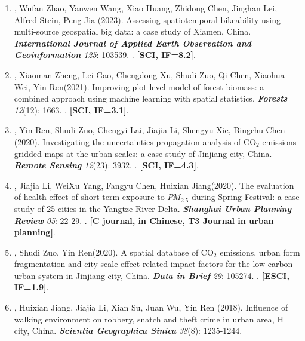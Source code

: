 \begin{enumerate}
    \Shaoqing, Ge Qiu, Yuchen Li, Shuhan Yang, Shujuan Yang, Peng Jia\CS (2024).
    State of the art of lifecourse cohort establishment. 
    \textbf{\textit{China CDC Weekly}} \textit{6}(14): 300–304 
    . \textbf{[SCI/SSCI, IF=3.5]}.
\item
    \Shaoqing, Wufan Zhao\CS, Yanwen Wang, Xiao Huang, Zhidong Chen, Jinghan Lei, Alfred Stein, Peng Jia (2023).
    Assessing spatiotemporal bikeability using multi-source geospatial big data: a case study of Xiamen, China. 
    \textbf{\textit{International Journal of Applied Earth Observation and Geoinformation}} \textit{125}: 103539.
    . \textbf{[SCI, IF=8.2]}.
\item
    \Shaoqing\CF, Xiaoman Zheng\CF, Lei Gao, Chengdong Xu, Shudi Zuo, Qi Chen, Xiaohua Wei, Yin Ren\CS (2021).
    Improving plot-level model of forest biomass: a combined approach using machine learning with spatial statistics.
    \textbf{\textit{Forests}} \textit{12}(12): 1663.
    . \textbf{[SCI, IF=3.1]}.
\item
    \Shaoqing\CF, Yin Ren\CF, Shudi Zuo\CS, Chengyi Lai, Jiajia Li, Shengyu Xie, Bingchu Chen (2020).
    Investigating the uncertainties propagation analysis of CO$_2$ emissions gridded maps at the urban scales: a case study of Jinjiang city, China. 
    \textbf{\textit{Remote Sensing}} \textit{12}(23): 3932.
    . \textbf{[SCI, IF=4.3]}.
\item
    \Shaoqing, Jiajia Li, WeiXu Yang, Fangyu Chen, Huixian Jiang\CS (2020).
    The evaluation of health effect of short-term exposure to $PM_{2.5}$ during Spring Festival: a case study of 25 cities in the Yangtze River Delta.
    \textbf{\textit{Shanghai Urban Planning Review}} \textit{05}: 22-29.
    . \textbf{[C journal, in Chinese, T3 Journal in urban planning]}.
\item
    \Shaoqing, Shudi Zuo, Yin Ren\CS (2020).
    A spatial database of CO$_2$ emissions, urban form fragmentation and city-scale effect related impact factors for the low carbon urban system in Jinjiang city, China.
    \textbf{\textit{Data in Brief}} \textit{29}: 105274.
    . \textbf{[ESCI, IF=1.9]}.
\item
    \Shaoqing, Huixian Jiang\CS, Jiajia Li, Xian Su, Juan Wu, Yin Ren (2018).
	Influence of walking environment on robbery, snatch and theft crime in urban area, H city, China.
    \textbf{\textit{Scientia Geographica Sinica}}  \textit{38}(8): 1235-1244.

\end{enumerate}
